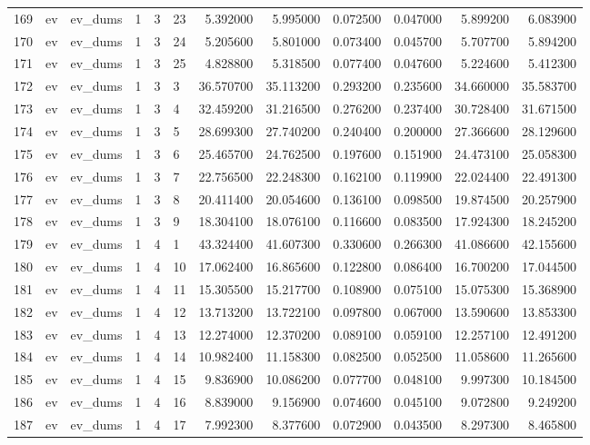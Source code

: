 \begin{tabular}{llllllrrrrrr}
169 & ev & ev_dums & 1 & 3 & 23 & 5.392000 & 5.995000 & 0.072500 & 0.047000 & 5.899200 & 6.083900 \\
170 & ev & ev_dums & 1 & 3 & 24 & 5.205600 & 5.801000 & 0.073400 & 0.045700 & 5.707700 & 5.894200 \\
171 & ev & ev_dums & 1 & 3 & 25 & 4.828800 & 5.318500 & 0.077400 & 0.047600 & 5.224600 & 5.412300 \\
172 & ev & ev_dums & 1 & 3 & 3 & 36.570700 & 35.113200 & 0.293200 & 0.235600 & 34.660000 & 35.583700 \\
173 & ev & ev_dums & 1 & 3 & 4 & 32.459200 & 31.216500 & 0.276200 & 0.237400 & 30.728400 & 31.671500 \\
174 & ev & ev_dums & 1 & 3 & 5 & 28.699300 & 27.740200 & 0.240400 & 0.200000 & 27.366600 & 28.129600 \\
175 & ev & ev_dums & 1 & 3 & 6 & 25.465700 & 24.762500 & 0.197600 & 0.151900 & 24.473100 & 25.058300 \\
176 & ev & ev_dums & 1 & 3 & 7 & 22.756500 & 22.248300 & 0.162100 & 0.119900 & 22.024400 & 22.491300 \\
177 & ev & ev_dums & 1 & 3 & 8 & 20.411400 & 20.054600 & 0.136100 & 0.098500 & 19.874500 & 20.257900 \\
178 & ev & ev_dums & 1 & 3 & 9 & 18.304100 & 18.076100 & 0.116600 & 0.083500 & 17.924300 & 18.245200 \\
179 & ev & ev_dums & 1 & 4 & 1 & 43.324400 & 41.607300 & 0.330600 & 0.266300 & 41.086600 & 42.155600 \\
180 & ev & ev_dums & 1 & 4 & 10 & 17.062400 & 16.865600 & 0.122800 & 0.086400 & 16.700200 & 17.044500 \\
181 & ev & ev_dums & 1 & 4 & 11 & 15.305500 & 15.217700 & 0.108900 & 0.075100 & 15.075300 & 15.368900 \\
182 & ev & ev_dums & 1 & 4 & 12 & 13.713200 & 13.722100 & 0.097800 & 0.067000 & 13.590600 & 13.853300 \\
183 & ev & ev_dums & 1 & 4 & 13 & 12.274000 & 12.370200 & 0.089100 & 0.059100 & 12.257100 & 12.491200 \\
184 & ev & ev_dums & 1 & 4 & 14 & 10.982400 & 11.158300 & 0.082500 & 0.052500 & 11.058600 & 11.265600 \\
185 & ev & ev_dums & 1 & 4 & 15 & 9.836900 & 10.086200 & 0.077700 & 0.048100 & 9.997300 & 10.184500 \\
186 & ev & ev_dums & 1 & 4 & 16 & 8.839000 & 9.156900 & 0.074600 & 0.045100 & 9.072800 & 9.249200 \\
187 & ev & ev_dums & 1 & 4 & 17 & 7.992300 & 8.377600 & 0.072900 & 0.043500 & 8.297300 & 8.465800 \\

\end{tabular}
